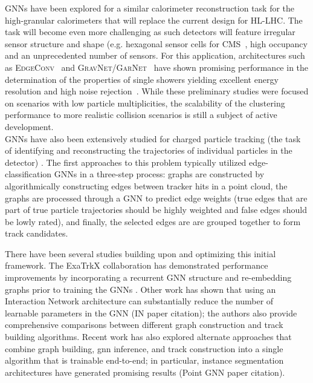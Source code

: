 GNNs have been explored for a similar calorimeter reconstruction task for the high-granular calorimeters that will replace the current design for HL-LHC.
The task will become even more challenging as such detectors will feature irregular sensor structure and shape (e.g. hexagonal sensor cells for CMS~\cite{collaboration:2017gbu}, high occupancy and an unprecedented number of sensors. For this application, architectures such as \textsc{EdgeConv}~\cite{DBLP:abs-1801-07829} and \textsc{GravNet/GarNet}~\cite{Qasim:2019otl} have shown promising performance in the determination of the properties of single showers yielding  excellent energy resolution and high noise rejection~\cite{Ju:2020xty}. While these preliminary studies were focused on scenarios with low particle multiplicities, the scalability of the clustering performance to more realistic collision scenarios is still a subject of active development.\\

GNNs have also been extensively studied for charged particle tracking (the task of identifying and reconstructing the trajectories of individual particles in the detector) \cite{exatrk_19,duarte_vlimant, heptrkx,dl_tracking}. The first approaches to this problem typically utilized edge-classification GNNs in a three-step process: graphs are constructed by algorithmically constructing edges between tracker hits in a point cloud, the graphs are processed through a GNN to predict edge weights (true edges that are part of true particle trajectories should be highly weighted and false edges should be lowly rated), and finally, the selected edges are are grouped together to form track candidates. 

There have been several studies building upon and optimizing this initial framework. The ExaTrkX collaboration has demonstrated performance improvements by incorporating a recurrent GNN structure \cite{exatrk_19} and re-embedding graphs prior to training the GNNs \cite{embedding}. Other work has shown that using an Interaction Network architecture \cite{battaglia2016interaction} can substantially reduce the number of learnable parameters in the GNN (IN paper citation); the authors also provide comprehensive comparisons between different graph construction and track building algorithms. Recent work has also explored alternate approaches that combine graph building, gnn inference, and track construction into a single algorithm that is trainable end-to-end; in particular, instance segmentation architectures have generated promising results (Point GNN paper citation).

